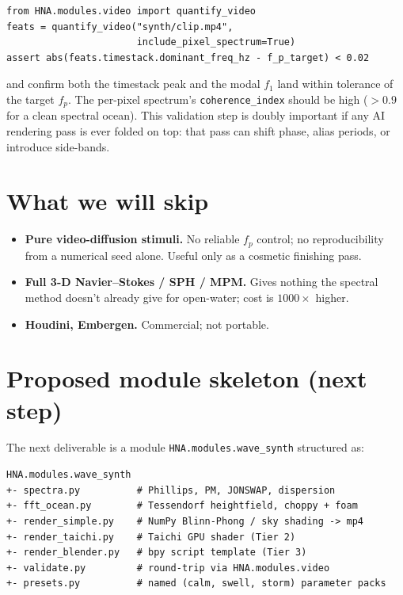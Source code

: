 \documentclass[11pt,a4paper]{article}
\newcommand{\code}[1]{\texttt{\small #1}}
\begin{document}
\begin{lstlisting}
from HNA.modules.video import quantify_video
feats = quantify_video("synth/clip.mp4",
                       include_pixel_spectrum=True)
assert abs(feats.timestack.dominant_freq_hz - f_p_target) < 0.02
\end{lstlisting}

and confirm both the timestack peak and the modal $f_1$ land within
tolerance of the target $f_p$. The per-pixel spectrum's
\code{coherence\_index} should be high ($>0.9$ for a clean spectral
ocean). This validation step is doubly important if any AI rendering
pass is ever folded on top: that pass can shift phase, alias periods, or
introduce side-bands.

\section{What we will skip}

\begin{itemize}[leftmargin=1.5em,itemsep=0.4em]
  \item \textbf{Pure video-diffusion stimuli.} No reliable $f_p$ control;
        no reproducibility from a numerical seed alone. Useful only as a
        cosmetic finishing pass.
  \item \textbf{Full 3-D Navier--Stokes / SPH / MPM.} Gives nothing the
        spectral method doesn't already give for open-water; cost is
        $1000\times$ higher.
  \item \textbf{Houdini, Embergen.} Commercial; not portable.
\end{itemize}

\section{Proposed module skeleton (next step)}

The next deliverable is a module \code{HNA.modules.wave\_synth} structured
as:

\begin{lstlisting}
HNA.modules.wave_synth
+- spectra.py          # Phillips, PM, JONSWAP, dispersion
+- fft_ocean.py        # Tessendorf heightfield, choppy + foam
+- render_simple.py    # NumPy Blinn-Phong / sky shading -> mp4
+- render_taichi.py    # Taichi GPU shader (Tier 2)
+- render_blender.py   # bpy script template (Tier 3)
+- validate.py         # round-trip via HNA.modules.video
+- presets.py          # named (calm, swell, storm) parameter packs
\end{lstlisting}
\end{document}
